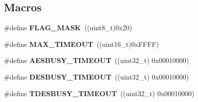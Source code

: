 \subsection*{Macros}
\begin{DoxyCompactItemize}
\item 
\hypertarget{group___c_r_y_p_ga890221cb651a3f30f6d1bca0d9b0e13d}{\#define {\bfseries F\-L\-A\-G\-\_\-\-M\-A\-S\-K}~((uint8\-\_\-t)0x20)}\label{group___c_r_y_p_ga890221cb651a3f30f6d1bca0d9b0e13d}

\item 
\hypertarget{group___c_r_y_p_ga85fda3522e69a1bf85f7dcd97b6023a1}{\#define {\bfseries M\-A\-X\-\_\-\-T\-I\-M\-E\-O\-U\-T}~((uint16\-\_\-t)0x\-F\-F\-F\-F)}\label{group___c_r_y_p_ga85fda3522e69a1bf85f7dcd97b6023a1}

\item 
\hypertarget{group___c_r_y_p_ga50631c7b2268fdbd5aaa74195e3ea746}{\#define {\bfseries A\-E\-S\-B\-U\-S\-Y\-\_\-\-T\-I\-M\-E\-O\-U\-T}~((uint32\-\_\-t) 0x00010000)}\label{group___c_r_y_p_ga50631c7b2268fdbd5aaa74195e3ea746}

\item 
\hypertarget{group___c_r_y_p_ga2046d6bd81c5f86df18fd0e5095be88a}{\#define {\bfseries D\-E\-S\-B\-U\-S\-Y\-\_\-\-T\-I\-M\-E\-O\-U\-T}~((uint32\-\_\-t) 0x00010000)}\label{group___c_r_y_p_ga2046d6bd81c5f86df18fd0e5095be88a}

\item 
\hypertarget{group___c_r_y_p_ga6a35296fd0d94e297d645bac32b03a13}{\#define {\bfseries T\-D\-E\-S\-B\-U\-S\-Y\-\_\-\-T\-I\-M\-E\-O\-U\-T}~((uint32\-\_\-t) 0x00010000)}\label{group___c_r_y_p_ga6a35296fd0d94e297d645bac32b03a13}

\end{DoxyCompactItemize}
